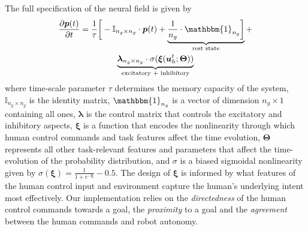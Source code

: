 \documentclass[conference]{IEEEtran}
\begin{document}
The full specification of the neural field is given by
\begin{multline}\label{eq:dft}
\frac{\partial \boldsymbol{p}(t)}{\partial t} = \frac{1}{\tau}\bigg[-\mathbb{I}_{n_g\times n_g}\cdot\boldsymbol{p}(t) + \underbrace{\frac{1}{n_g}\cdot\mathbbm{1}_{n_g}\bigg]}_{\text{rest state}} + \\ \underbrace{\boldsymbol{\lambda}_{n_g\times n_g}\cdot\sigma(\boldsymbol{\xi}(\boldsymbol{u}_h^t;\boldsymbol{\Theta}))}_{\text{excitatory + inhibitory}}
\end{multline}
where time-scale parameter $\tau$ determines the memory capacity of the system, $\mathbb{I}_{n_g\times n_g}$ is the identity matrix, $\mathbbm{1}_{n_g}$ is a vector of dimension $n_g \times 1$ containing all ones, $\boldsymbol{\lambda}$ is the control matrix that controls the excitatory and inhibitory aspects, $\boldsymbol{\xi}$ is a function that encodes the nonlinearity through which human control commands and task features affect the time evolution, $\boldsymbol{\Theta}$ represents all other task-relevant features and parameters that affect the time-evolution of the probability distribution, and $\sigma$ is a biased sigmoidal nonlinearity given by $\sigma(\boldsymbol{\xi}) = \frac{1}{1 + e^{-\boldsymbol{\xi}}} - 0.5$. 
The design of $\boldsymbol{\xi}$ is informed by what features of the human control input and environment capture the human's underlying intent most effectively. Our implementation relies on the \textit{directedness} of the human control commands towards a goal, the \textit{proximity} to a goal and the \textit{agreement} between the human commands and robot autonomy.
\end{document}
